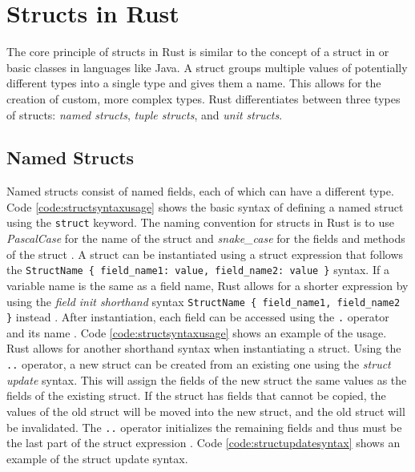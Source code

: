 \section{Structs in Rust}
The core principle of structs in Rust is similar to the concept of a struct in \Cpp or basic classes in languages like Java.
A struct groups multiple values of potentially different types into a single type and gives them a name.
This allows for the creation of custom, more complex types.
Rust differentiates between three types of structs: \textit{named structs}, \textit{tuple structs}, and \textit{unit structs}. \cite[Chapter~6.6]{rustref}


\subsection{Named Structs}
Named structs consist of named fields, each of which can have a different type.
Code \ref{code:structsyntaxusage} shows the basic syntax of defining a named struct using the \texttt{struct} keyword.
The naming convention for structs in Rust is to use \mbox{\textit{PascalCase}} for the name of the struct and \mbox{\textit{snake\_case}} for the fields and methods of the struct \cite{rustapiguidelines}.
A struct can be instantiated using a struct expression that follows the \texttt{StructName \{ field\_name1: value, field\_name2: value \}} syntax.
If a variable name is the same as a field name, Rust allows for a shorter expression by using the \textit{field init shorthand} syntax \texttt{StructName \{ field\_name1, field\_name2 \}} instead \cite[RFC 1682]{rustrfc}.
After instantiation, each field can be accessed using the \texttt{.} operator and its name \cite[Chapter~5.1]{rustbook}.
Code \ref{code:structsyntaxusage} shows an example of the usage.
Rust allows for another shorthand syntax when instantiating a struct.
Using the \texttt{..} operator, a new struct can be created from an existing one using the \textit{struct update} syntax.
This will assign the fields of the new struct the same values as the fields of the existing struct.
If the struct has fields that cannot be copied, the values of the old struct will be moved into the new struct, and the old struct will be invalidated.
The \texttt{..} operator initializes the remaining fields and thus must be the last part of the struct expression \cite[Chapter~5.1]{rustbook}.
Code \ref{code:structupdatesyntax} shows an example of the struct update syntax.


